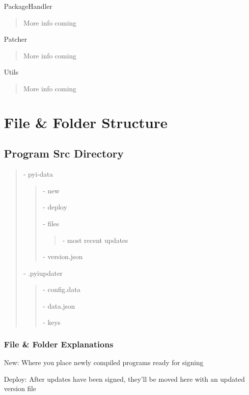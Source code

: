 \documentclass[letterpaper,10pt,english]{sphinxmanual}
\begin{document}
PackageHandler
\begin{quote}

More info coming
\end{quote}

Patcher
\begin{quote}

More info coming
\end{quote}

Utils
\begin{quote}

More info coming
\end{quote}


\section{File \& Folder Structure}
\label{folder_structure::doc}\label{folder_structure:file-folder-structure}

\subsection{Program Src Directory}
\label{folder_structure:program-src-directory}\begin{quote}

- pyi-data
\begin{quote}

- new

- deploy

- files
\begin{quote}

- most recent updates
\end{quote}

- version.json
\end{quote}

- .pyiupdater
\begin{quote}

- config.data

- data.json

- keys
\end{quote}
\end{quote}


\subsubsection{File \& Folder Explanations}
\label{folder_structure:file-folder-explanations}
New: Where you place newly compiled programs ready for signing

Deploy: After updates have been signed, they'll be moved here with an updated version file
\end{document}
